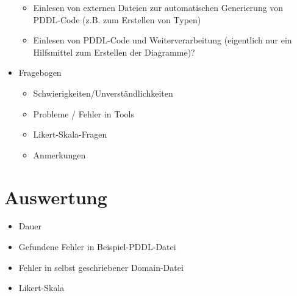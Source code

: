 \documentclass[11pt]{article}
\begin{document}
\begin{itemize}
\begin{itemize}
\item Einlesen von externen Dateien zur automatischen Generierung von
PDDL-Code (z.B. zum Erstellen von Typen)
\item Einlesen von PDDL-Code und Weiterverarbeitung (eigentlich nur ein
Hilfsmittel zum Erstellen der Diagramme)?
\end{itemize}
\item Fragebogen
\begin{itemize}
\item Schwierigkeiten/Unverständlichkeiten
\item Probleme / Fehler in Tools
\item Likert-Skala-Fragen
\item Anmerkungen
\end{itemize}
\end{itemize}
\section{Auswertung}
\label{sec-3}
\begin{itemize}
\item Dauer
\item Gefundene Fehler in Beispiel-PDDL-Datei
\item Fehler in selbst geschriebener Domain-Datei
\item Likert-Skala
\end{itemize}
\end{document}
